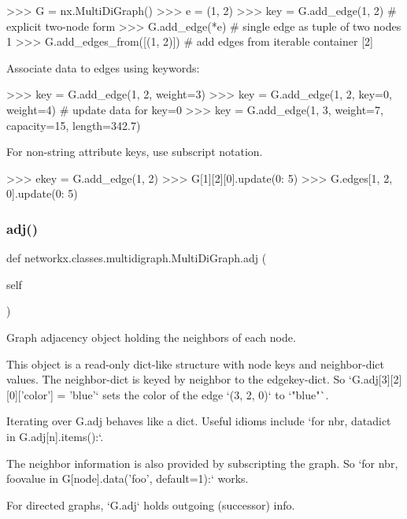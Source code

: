 \begin{DoxyVerb}
>>> G = nx.MultiDiGraph()
>>> e = (1, 2)
>>> key = G.add_edge(1, 2)  # explicit two-node form
>>> G.add_edge(*e)  # single edge as tuple of two nodes
1
>>> G.add_edges_from([(1, 2)])  # add edges from iterable container
[2]

Associate data to edges using keywords:

>>> key = G.add_edge(1, 2, weight=3)
>>> key = G.add_edge(1, 2, key=0, weight=4)  # update data for key=0
>>> key = G.add_edge(1, 3, weight=7, capacity=15, length=342.7)

For non-string attribute keys, use subscript notation.

>>> ekey = G.add_edge(1, 2)
>>> G[1][2][0].update({0: 5})
>>> G.edges[1, 2, 0].update({0: 5})
\end{DoxyVerb}
 \mbox{\label{classnetworkx_1_1classes_1_1multidigraph_1_1MultiDiGraph_aa91b54bd53ee46766de3fa6abd016275}} 
\subsubsection{\texorpdfstring{adj()}{adj()}}
{\footnotesize\ttfamily def networkx.\+classes.\+multidigraph.\+Multi\+Di\+Graph.\+adj (\begin{DoxyParamCaption}\item[{}]{self }\end{DoxyParamCaption})}

\begin{DoxyVerb}Graph adjacency object holding the neighbors of each node.

This object is a read-only dict-like structure with node keys
and neighbor-dict values.  The neighbor-dict is keyed by neighbor
to the edgekey-dict.  So `G.adj[3][2][0]['color'] = 'blue'` sets
the color of the edge `(3, 2, 0)` to `"blue"`.

Iterating over G.adj behaves like a dict. Useful idioms include
`for nbr, datadict in G.adj[n].items():`.

The neighbor information is also provided by subscripting the graph.
So `for nbr, foovalue in G[node].data('foo', default=1):` works.

For directed graphs, `G.adj` holds outgoing (successor) info.
\end{DoxyVerb}
 \mbox{\label{classnetworkx_1_1classes_1_1multidigraph_1_1MultiDiGraph_a957f3f3e1f84e83c50360a486305c115}} 
